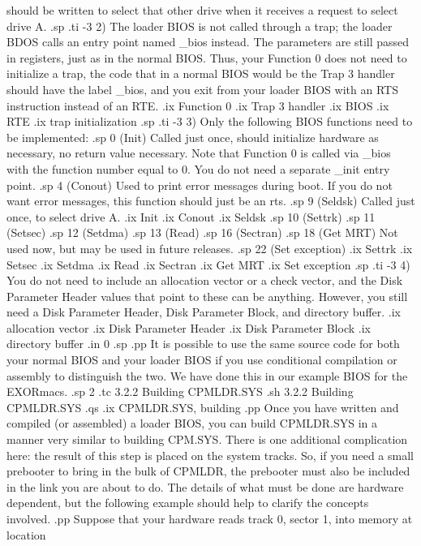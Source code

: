 should be written to select that other drive when it receives a request to
select drive A.
.sp
.ti -3
2) The loader BIOS is not called through a trap; the loader BDOS calls an entry
point named _bios instead.  The parameters are still passed in registers, just
as in the normal BIOS.  Thus, your Function 0 does not need to 
initialize a trap, the code that in a normal BIOS would be the Trap 3 
handler should have the label _bios, and you exit from your loader BIOS with
an RTS instruction instead of an RTE.
.ix Function 0
.ix Trap 3 handler
.ix BIOS
.ix RTE
.ix trap initialization
.sp
.ti -3
3) Only the following BIOS functions need to be implemented:
.sp
0  (Init)    Called just once, should initialize hardware as necessary, no  return value necessary.  Note that Function 0 is called via _bios with the 
function number equal to 0.  You do not need a separate _init entry point. 
.sp
4  (Conout)  Used to print error messages during boot.  If you do not want 
error messages, this function should just be an rts.
.sp
9  (Seldsk)  Called just once, to select drive A. 
.ix Init
.ix Conout
.ix Seldsk
.sp
10 (Settrk)
.sp
11 (Setsec)
.sp
12 (Setdma)
.sp
13 (Read)
.sp
16 (Sectran)
.sp
18 (Get MRT) Not used now, but may be used in future releases.
.sp
22 (Set exception)
.ix Settrk
.ix Setsec
.ix Setdma
.ix Read
.ix Sectran
.ix Get MRT
.ix Set exception
.sp
.ti -3
4) You do not need to include an allocation vector or a check vector, and the 
Disk Parameter Header values that point to these can be anything.  However, 
you still need a Disk Parameter Header, Disk Parameter Block, and directory 
buffer.
.ix allocation vector
.ix Disk Parameter Header
.ix Disk Parameter Block
.ix directory buffer
.in 0
.sp
.pp
It is possible to use the same source code for both your normal BIOS and
your loader BIOS if you use conditional compilation or assembly to 
distinguish the two.
We have done this in our example BIOS for the EXORmacs.
.sp 2
.tc         3.2.2  Building CPMLDR.SYS
.sh
3.2.2 Building CPMLDR.SYS
.qs
.ix CPMLDR.SYS, building
.pp
Once you have written and compiled (or assembled) a loader BIOS, you can build
CPMLDR.SYS in a manner very similar to building CPM.SYS.  There is one 
additional complication here:  the result of this step is 
placed on the system tracks.  So, if you need a small prebooter to bring
in the bulk of CPMLDR, the prebooter must also be included in the link
you are about to do.  The details of what must be done are hardware dependent,
but the following example should help to clarify the concepts involved.
.pp
Suppose that your hardware reads track 0, sector 1, into memory at location
